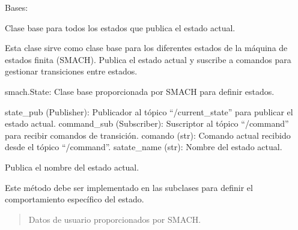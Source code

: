 \documentclass[a4paper,10pt,spanish]{sphinxmanual}
\begin{document}

\begin{fulllineitems}
\label{\detokenize{squad_state_manager:squad_state_manager.BaseState}}
\pysigstartsignatures
{}
\pysigstopsignatures
\sphinxAtStartPar
Bases: 

\sphinxAtStartPar
Clase base para todos los estados que publica el estado actual.

\sphinxAtStartPar
Esta clase sirve como clase base para los diferentes estados de la máquina de estados finita (SMACH).
Publica el estado actual y suscribe a comandos para gestionar transiciones entre estados.
\begin{description}
\sphinxAtStartPar
smach.State: Clase base proporcionada por SMACH para definir estados.

\sphinxAtStartPar
state\_pub (Publisher): Publicador al tópico “/current\_state” para publicar el estado actual.
command\_sub (Subscriber): Suscriptor al tópico “/command” para recibir comandos de transición.
comando (str): Comando actual recibido desde el tópico “/command”.
satate\_name (str): Nombre del estado actual.

\end{description}

\begin{fulllineitems}
\label{\detokenize{squad_state_manager:squad_state_manager.BaseState.execute}}
\pysigstartsignatures
{}
\pysigstopsignatures
\sphinxAtStartPar
Publica el nombre del estado actual.

\sphinxAtStartPar
Este método debe ser implementado en las subclases para definir el comportamiento específico del estado.
\begin{quote}\begin{description}
\sphinxAtStartPar
{} \textendash{} Datos de usuario proporcionados por SMACH.


\end{description}
\end{quote}
\end{fulllineitems}
\end{fulllineitems}
\end{document}
